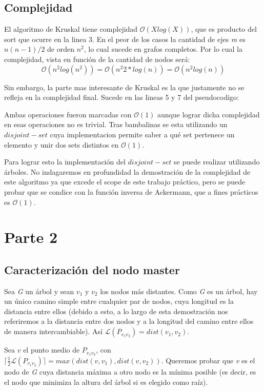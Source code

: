 \documentclass[a4paper]{report}
\begin{document}
\subsection{Complejidad}

El algoritmo de Kruskal tiene complejidad $\mathcal{O}(X log(X))$, que es producto del sort que ocurre en la linea 3. En el peor de los casos la cantidad de ejes \textit{m} es $n(n-1)/2$ de orden $n^2$, lo cual sucede en grafos completos. Por lo cual la complejidad, vista en función de la cantidad de nodos será: $$\mathcal{O}(n^2 log(n^2)) = \mathcal{O}(n^2 2*log(n)) = \mathcal{O}(n^2 log(n))$$

Sin embargo, la parte mas interesante de Kruskal es la que justamente no se refleja en la complejidad final. Sucede en las lineas 5 y 7 del pseudocodigo:

Ambas operaciones fueron marcadas con {$\mathcal{O}(1)$} aunque lograr dicha complejidad en esas operaciones no es trivial. Tras bambalinas se esta utilizando un $disjoint-set$ cuya implementacion permite saber a qué set pertenece un elemento y unir dos sets distintos en $\mathcal{O}(1)$.

Para lograr esto la implementación del $disjoint-set$ se puede realizar utilizando árboles. No indagaremos en profundidad la demostración de la complejidad de este algoritmo ya que excede el scope de este trabajo práctico, pero se puede probar que se condice con la función inversa de Ackermann, que a fines prácticos es $\mathcal{O}(1)$.

\section{Parte 2}

\subsection{Caracterización del nodo master}

Sea \textit{G} un árbol y sean $v_{1}$ y $v_{2}$ los nodos más distantes. Como \textit{G} es un árbol, hay un único camino simple entre cualquier par de nodos, cuya longitud es la distancia entre ellos (debido a esto, a lo largo de esta demostración nos referiremos a la distancia entre dos nodos y a la longitud del camino entre ellos de manera intercambiable). Así $\mathcal{L}(P_{v_{1} v_{2}}) = dist(v_{1}, v_{2})$.

Sea $v$ el punto medio de $P_{v_{1} v_{2}}$, con $\lceil \frac{1}{2} \mathcal{L}(P_{v_{1} v_{2}}) \rceil = max(dist(v,v_{1}), dist(v,v_{2}))$. Queremos probar que \textit{v} es el nodo de \textit{G} cuya distancia máxima a otro nodo es la mínima posible (es decir, es el nodo que minimiza la altura del árbol si es elegido como raíz).
\end{document}
